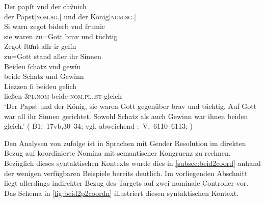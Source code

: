\begin{exe}
\ex\label{ex:papstkoenig5} %
	\gll Der papſt vnd der chv̂nich \\
		der Papst[\textsc{nom.sg.\MascM}] und der König[\textsc{nom.sg.\MascM}]
		\\
\sn \gll Si warn zegot biderb vnd frumic \\
		sie waren {zu=Gott} brav und tüchtig \\
\sn \gll Zegot ſtuͦnt allr ir geſín \\
		{zu=Gott} stand aller ihr Sinnen \\
\sn \gll Beideu ſchatz vnd gewín \\
		beide Schatz und Gewinn \\
\sn \gll Liezzen ſi beideu gelich \\
		ließen \textsc{3pl\subM.nom} beide-\textsc{nom.pl.\NeutM.st} gleich \\
	\trans `Der Papst und der König, sie waren Gott gegenüber brav und
		tüchtig. Auf Gott war all ihr Sinnen gerichtet. Sowohl Schatz als auch
		Gewinn war ihnen beiden gleich.'
		(%
			B1:~17vb,30--34; vgl. abweichend
			\KC:~V.~6110--6113;
			\cite[202]{schroeder1895}%
		)
\end{exe}

Den Analysen von \citet{wechsler2009,wechslerzlatic2003} zufolge ist in
Sprachen mit Gender Resolution im direkten Bezug auf koordinierte Nomina mit
semantischer Kongruenz zu rechnen. Bezüglich dieses syntaktischen Kontexts
wurde dies in \cref{subsec:beid2coord} anhand der wenigen verfügbaren Beispiele
bereits deutlich. Im vorliegenden Abschnitt liegt allerdings indirekter
Bezug des Targets  auf zwei nominale Controller vor. Das Schema
in \cref{fig:beid2p2coordn} illustriert diesen syntaktischen Kontext.

